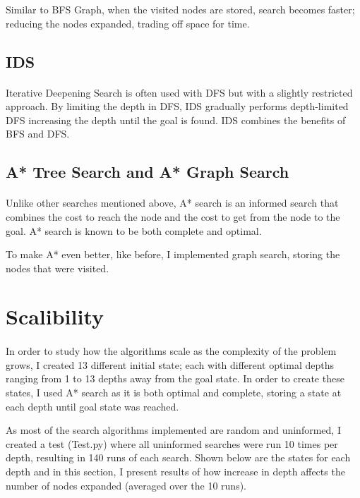 \documentclass[10pt]{article}
\begin{document}
  Similar to BFS Graph, when the visited nodes are stored, search becomes faster; reducing the nodes expanded, trading off space for time. 


  \subsection{IDS}
  \paragraph{} \indent
  Iterative Deepening Search is often used with DFS but with a slightly restricted approach. By limiting the depth in DFS, IDS gradually performs depth-limited DFS increasing the depth until the goal is found. IDS combines the benefits of BFS and DFS.


  \subsection{A* Tree Search and A* Graph Search}
  \paragraph{} \indent
  Unlike other searches mentioned above, A* search is an informed search that combines the cost to reach the node and the cost to get from the node to the goal. A* search is known to be both complete and optimal. 

  To make A* even better, like before, I implemented graph search, storing the nodes that were visited.

  \section{Scalibility}
  \paragraph{} \indent
  In order to study how the algorithms scale as the complexity of the problem grows, I created 13 different initial state; each with different optimal depths ranging from 1 to 13 depths away from the goal state. In order to create these states, I used A* search as it is both optimal and complete, storing a state at each depth until goal state was reached. 

  As most of the search algorithms implemented are random and uninformed, I created a test (Test.py) where all uninformed searches were run 10 times per depth, resulting in 140 runs of each search. Shown below are the states for each depth and in this section, I present results of how increase in depth affects the number of nodes expanded (averaged over the 10 runs). 
\end{document}
